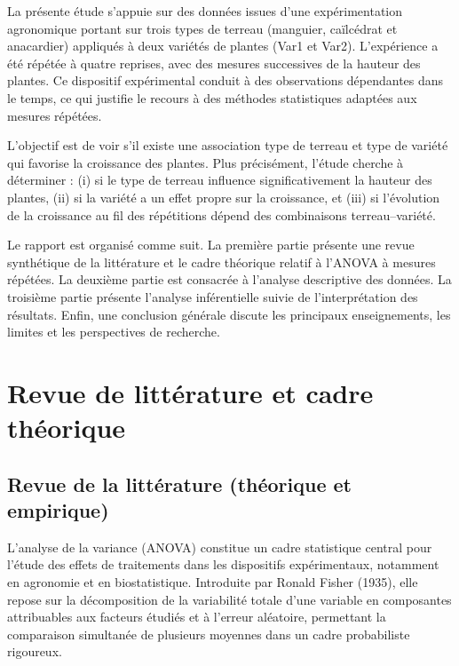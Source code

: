 \documentclass[12pt, a4paper]{report}
\begin{document}
La présente étude s'appuie sur des données issues d'une expérimentation agronomique portant
sur trois types de terreau (manguier, caïlcédrat et anacardier) appliqués à deux variétés de
plantes (Var1 et Var2). L'expérience a été répétée à quatre reprises, avec des mesures
successives de la hauteur des plantes. Ce dispositif expérimental conduit à des observations
dépendantes dans le temps, ce qui justifie le recours à des méthodes statistiques adaptées
aux mesures répétées.

L’objectif est de voir s’il existe une association type de terreau et type de variété qui favorise la croissance des plantes. Plus précisément, l'étude cherche à déterminer : (i) si le type de terreau influence significativement la
hauteur des plantes, (ii) si la variété a un effet propre sur la croissance, et (iii) si
l'évolution de la croissance au fil des répétitions dépend des combinaisons terreau–variété.

Le rapport est organisé comme suit. La première partie présente une revue synthétique de la
littérature et le cadre théorique relatif à l'ANOVA à mesures répétées. La deuxième partie
est consacrée à l'analyse descriptive des données. La troisième partie présente l'analyse
inférentielle suivie de l'interprétation des résultats. Enfin, une conclusion générale
discute les principaux enseignements, les limites et les perspectives de recherche.


\setcounter{page}{1}

\chapter{Revue de littérature et cadre théorique}

\section{Revue de la littérature (théorique et empirique)}

L’analyse de la variance (ANOVA) constitue un cadre statistique central pour l’étude des effets de traitements dans les dispositifs expérimentaux, notamment en agronomie et en biostatistique. Introduite par Ronald Fisher (1935), elle repose sur la décomposition de la variabilité totale d’une variable en composantes attribuables aux facteurs étudiés et à l’erreur aléatoire, permettant la comparaison simultanée de plusieurs moyennes dans un cadre probabiliste rigoureux.
\end{document}

